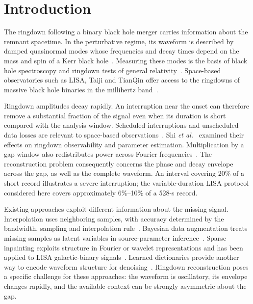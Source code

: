 \documentclass[10pt,prd,aps,a4paper,twocolumn,superscriptaddress,nofootinbib,floatfix]{revtex4-2}
\begin{document}
\section{Introduction}
The ringdown following a binary black hole merger carries information about the remnant spacetime. In the perturbative regime, its waveform is described by damped quasinormal modes whose frequencies and decay times depend on the mass and spin of a Kerr black hole~\cite{berti2006gravitational,berti2009qnm}. Measuring these modes is the basis of black hole spectroscopy and ringdown tests of general relativity~\cite{Isi_2019}. Space-based observatories such as LISA, Taiji and TianQin offer access to the ringdowns of massive black hole binaries in the millihertz band~\cite{amaroseoane2017laserinterferometerspaceantenna,robson2019construction,Ruan2020,Luo2016}.

Ringdown amplitudes decay rapidly. An interruption near the onset can therefore remove a substantial fraction of the signal even when its duration is short compared with the analysis window. Scheduled interruptions and unscheduled data losses are relevant to space-based observations~\cite{Baghi2019,dey2021gaps}. Shi \textit{et al.}~\cite{shi2024effectsdatagapsringdown} examined their effects on ringdown observability and parameter estimation. Multiplication by a gap window also redistributes power across Fourier frequencies~\cite{Harris1978}. The reconstruction problem consequently concerns the phase and decay envelope across the gap, as well as the complete waveform. An interval covering 20\% of a short record illustrates a severe interruption; the variable-duration LISA protocol considered here covers approximately 6\%--10\% of a 528-s record.

Existing approaches exploit different information about the missing signal. Interpolation uses neighboring samples, with accuracy determined by the bandwidth, sampling and interpolation rule~\cite{Horowitz1974,Maeland1988,Unser1999}. Bayesian data augmentation treats missing samples as latent variables in source-parameter inference~\cite{Baghi2019}. Sparse inpainting exploits structure in Fourier or wavelet representations and has been applied to LISA galactic-binary signals~\cite{Blelly2021,Starck2010}. Learned dictionaries provide another way to encode waveform structure for denoising~\cite{TorresForne2016}. Ringdown reconstruction poses a specific challenge for these approaches: the waveform is oscillatory, its envelope changes rapidly, and the available context can be strongly asymmetric about the gap.
\end{document}
